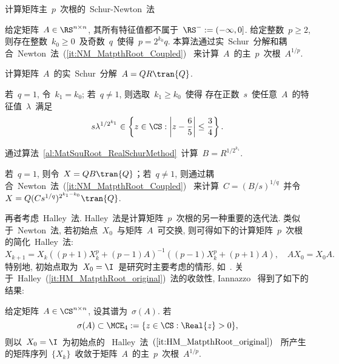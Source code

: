 \begin{algorithm}[h!]
\caption{计算矩阵主~$p$~次根的~Schur-Newton~法~\cite[算法~
3]{Iannazzo2008}} \label{al:MatpthRoot_SchurNewton_Ian08}
给定矩阵~$A\in\RS^{n\times n}$, 其所有特征值都不属于~$\RS^- :=
(-\infty,0]$. 给定整数~$p\geq 2$, 则存在整数~$k_0 \geq
0$~及奇数~$q$~使得~$p = 2^{k_0}q$.
本算法通过实~Schur~分解和耦合~Newton~法~(\ref{it:NM_MatpthRoot_Coupled})~
来计算~$A$~的主~$p$~次根~$A^{1/p}$.
\begin{list}{.}{
\setlength{\rightmargin}{0em}\setlength{\leftmargin}{1.2em}}
\item
计算矩阵~$A$~的实~Schur~分解~$A = QR\tran{Q}$.
\item
若~$q=1$, 令~$k_1 = k_0$; 若~$q\neq1$, 则选取~$k_1\geq k_0$~使得
存在正数~$s$~使任意~$A$~的特征值~$\lambda$~满足
$$
s \lambda^{1/{2^{k_1}}} \in \left\{z\in \CS: \left|z -
\frac{6}{5}\right| \leq \frac{3}{4}\right\}.
$$
\item
通过算法~\ref{al:MatSquRoot_RealSchurMethod}~计算~$B =
R^{1/{2^{k_1}}}$.
\item
若~$q=1$, 则令~$X = QB\tran{Q}$；若~$q\neq 1$,
则通过耦合~Newton~法~(\ref{it:NM_MatpthRoot_Coupled})~ 来计算~$C =
(B/s)^{1/q}$~并令~$X = Q(Cs^{1/q})^{2^{k_1-k_0}}\tran{Q}$.
\end{list}
\end{algorithm}



再者考虑~Halley~法.
Halley~法是计算矩阵~$p$~次根的另一种重要的迭代法. 类似于~Newton~法,
若初始点~$X_0$~与矩阵~$A$~可交换,
则可得如下的计算矩阵~$p$~次根的简化~Halley~法:
\begin{equation}
\label{it:HM_MatpthRoot_original} X_{k+1} = X_k\left((p+1)X_k^p +
(p-1)A\right)^{-1} \left((p-1)X_k^p + (p+1)A\right), \quad AX_0 =
X_0A.
\end{equation}
特别地, 初始点取为~$X_0 = \I$~是研究时主要考虑的情形,
如~\cite{Iannazzo2008,Guo2010,Lin2010,Laszkiewicz2009,Zietak2013}.
关于~Halley~(\ref{it:HM_MatpthRoot_original})~法的收敛性,  Iannazzo
\cite{Iannazzo2008}~得到了如下的结果:

\begin{theorem}
\label{th:Conv_HM_Ian08} 给定矩阵~$A\in\CS^{n\times n}$,
设其谱为~$\sigma(A)$. 若
\begin{equation}
\label{set:ConvReg_HM_Ian08} \sigma(A) \subset  \MCE_4 := \{z\in
\CS: \Real{z}>0\},
\end{equation}
则以~$X_0 = \I$~为初始点的
~Halley~法~$(\ref{it:HM_MatpthRoot_original})$~
所产生的矩阵序列~$\{X_k\}$~收敛于矩阵~$A$~的主~$p$~次根~$A^{1/p}$.
\end{theorem}

